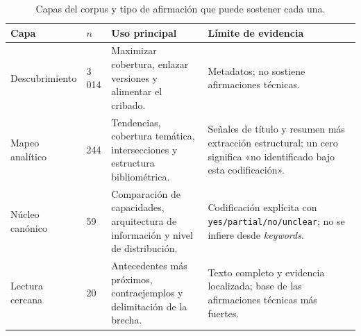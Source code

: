 \begin{table}[!htbp]
  \centering
  \caption{Capas del corpus y tipo de afirmación que puede sostener cada una.}
  \label{tab:lit-corpus-layers}
{\fontsize{7.6}{8.6}\selectfont\setlength{\tabcolsep}{3pt}\renewcommand{\arraystretch}{1.25}
\begin{tabularx}{\linewidth}{@{}J{2.5cm}K{1.0cm}J{5.1cm}Z@{}}
\toprule
\textbf{Capa} & \textbf{$n$} & \textbf{Uso principal} & \textbf{Límite de evidencia}\\
\midrule
{}
Descubrimiento & 3\,014 & Maximizar cobertura, enlazar versiones y alimentar el cribado. & Metadatos; no sostiene afirmaciones técnicas.\\
Mapeo analítico & 244 & Tendencias, cobertura temática, intersecciones y estructura bibliométrica. & Señales de título y resumen más extracción estructural; un cero significa «no identificado bajo esta codificación».\\
Núcleo canónico & 59 & Comparación de capacidades, arquitectura de información y nivel de distribución. & Codificación explícita con \texttt{yes/partial/no/unclear}; no se infiere desde \emph{keywords}.\\
Lectura cercana & 20 & Antecedentes más próximos, contraejemplos y delimitación de la brecha. & Texto completo y evidencia localizada; base de las afirmaciones técnicas más fuertes.\\
\bottomrule
\end{tabularx}}
\end{table}
